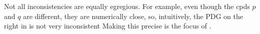 \documentclass{article}
\theoremstyle{plain}
\theoremstyle{definition}
\theoremstyle{remark}
\numberwithin{equation}{section}
\begin{document}
Not all inconsistencies are equally egregious. For example, even though the cpds
$p$ and $q$ are different, they are numerically close, so, intuitively, the PDG on the right in
 is not very inconsistent%
Making this precise 
is
the focus of .


%
\end{document}
